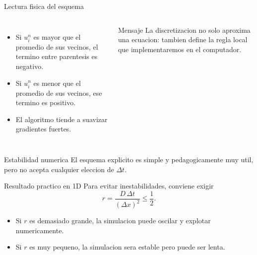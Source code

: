 \begin{frame}{Lectura fisica del esquema}
\begin{columns}[T,onlytextwidth]
\begin{itemize}
    \item Si $u_i^n$ es mayor que el promedio de sus vecinos, el termino entre parentesis es negativo.
    \item Si $u_i^n$ es menor que el promedio de sus vecinos, ese termino es positivo.
    \item El algoritmo tiende a suavizar gradientes fuertes.
\end{itemize}

\begin{alertblock}{Mensaje}
La discretizacion no solo aproxima una ecuacion: tambien define la regla local que implementaremos en el computador.
\end{alertblock}

\end{columns}
\end{frame}

\begin{frame}{Estabilidad numerica}
\justifying
El esquema explicito es simple y pedagogicamente muy util, pero no acepta cualquier eleccion de $\Delta t$.

\begin{block}{Resultado practico en 1D}
Para evitar inestabilidades, conviene exigir
\[
r=\frac{D\,\Delta t}{(\Delta x)^2} \le \frac{1}{2}.
\]
\end{block}

\begin{itemize}
    \item Si $r$ es demasiado grande, la simulacion puede oscilar y explotar numericamente.
    \item Si $r$ es muy pequeno, la simulacion sera estable pero puede ser lenta.
\end{itemize}
\end{frame}

